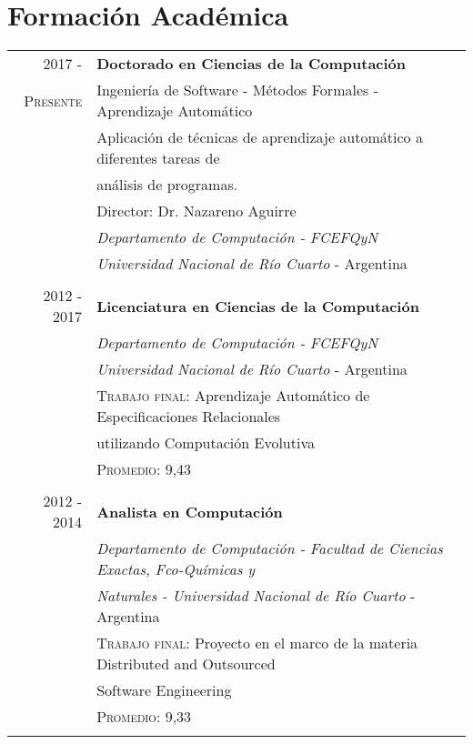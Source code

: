 \documentclass[a4paper,10pt]{article} %
\begin{document}
\section{Formación Académica}
\begin{tabular}{rl}
\\
\textsc{2017 -}	& \textbf{Doctorado en Ciencias de la Computación} \\
\textsc{Presente}  & Ingeniería de Software - Métodos Formales - Aprendizaje Automático \\
& Aplicación de técnicas de aprendizaje automático a diferentes tareas de \\ 
& análisis de programas. \\
& Director: Dr. Nazareno Aguirre \\
& \textit{Departamento de Computación - FCEFQyN} \\ & \textit{Universidad Nacional de Río Cuarto} - Argentina \\  & \\

\textsc{2012 - 2017}	& \textbf{Licenciatura en Ciencias de la Computación} \\
& \textit{Departamento de Computación - FCEFQyN} \\ & \textit{Universidad Nacional de Río Cuarto} - Argentina \\ 
& \textsc{Trabajo final:} Aprendizaje Automático de Especificaciones Relacionales \\ &
utilizando Computación Evolutiva  \\ & \textsc{Promedio:} 9,43 \\ & \\

\textsc{2012 - 2014}	& \textbf{Analista en Computación} \\
 					& \textit{Departamento de Computación - Facultad de Ciencias Exactas, Fco-Químicas y} \\ & \textit{Naturales - Universidad Nacional de Río Cuarto} - Argentina \\
& \textsc{Trabajo final:} Proyecto en el marco de la materia Distributed and Outsourced \\ & Software Engineering \\ & \textsc{Promedio:} 9,33 \\  \\ 
\end{tabular}
\end{document}
